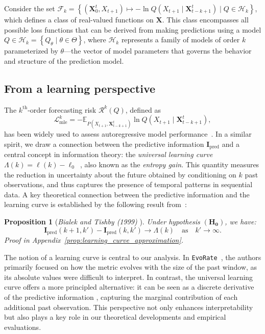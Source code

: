 \documentclass{article}
\newtheorem{proposition}[theorem]{Proposition}
\begin{document}
Consider the set $\mathcal{F}_k = \left\{ \left( \mathbf{X}_{0}^{t}, X_{t+1} \right) \mapsto -\ln Q\left( X_{t+1} \mid \mathbf{X}_{t-k+1}^{t} \right) \mid Q \in \mathcal{H}_k \right\}$, which defines a class of real-valued functions on $\mathbf{X}$. This class encompasses all possible loss functions that can be derived from making predictions using a model $Q \in \mathcal{H}_k = \left\{ Q_{\theta} \mid \theta \in \Theta \right\}$, where $\mathcal{H}_k$ represents a family of models of order $k$ parameterized by $\theta$—the vector of model parameters that governs the behavior and structure of the prediction model.

\subsection{From a learning perspective}

The $k^{\text{th}}$-order forecasting risk $\mathcal{R}^{k}(Q)$, defined as 
\begin{equation}
\mathcal{L}_{\mathrm{mle}}^{k} = -\mathbb{E}_{P(X_{t+1}, \mathbf{X}_{t-k+1}^t)} \ln Q(X_{t+1} \mid \mathbf{X}_{t-k+1}^t),
\end{equation}
has been widely used to assess autoregressive model performance~\cite{rangapuram2018deep, zeng2025towards}. In a similar spirit, we draw a connection between the predictive information $\mathbf{I}_{\text{pred}}$ and a central concept in information theory: the \emph{universal learning curve} $\Lambda(k) = \ell(k) - \ell_0$~\cite{bialek1999predictive, crutchfield2003regularities}, also known as the \emph{entropy gain}. This quantity measures the reduction in uncertainty about the future obtained by conditioning on $k$ past observations, and thus captures the presence of temporal patterns in sequential data.
A key theoretical connection between the predictive information and the learning curve is established by the following result from~\citet{bialek1999predictive}:
\begin{proposition}[\textit{Bialek and Tishby (1999)} \cite{bialek1999predictive}]\label{prop:Approximation_of_the_Universal_Learning_Curve}
Under hypothesis $\mathbf{(H_0)}$, we have:
\[
\mathbf{I}_{\text{pred}}(k+1,k') - \mathbf{I}_{\text{pred}}(k,k') \longrightarrow \Lambda(k) \quad \text{as} \quad k' \to \infty.
\]
\textit{Proof in Appendix~\ref{prop:learning_curve_approximation}.}
\end{proposition}
The notion of a learning curve is central to our analysis. In \texttt{EvoRate}~\cite{zeng2025towards}, the authors primarily focused on how the metric evolves with the size of the past window, as its absolute values were difficult to interpret. In contrast, the universal learning curve offers a more principled alternative: it can be seen as a discrete derivative of the predictive information \cite{bialek1999predictive}, capturing the marginal contribution of each additional past observation. This perspective not only enhances interpretability but also plays a key role in our theoretical developments and empirical evaluations.
\end{document}
